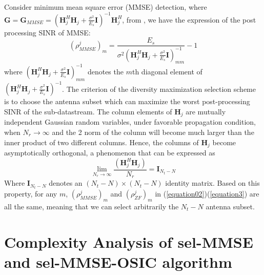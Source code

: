\documentclass[12pt,a4paper,final]{article}
\begin{document}
\begin{spacing}{2.5}
\begin{equation}
\end{equation}\\
Consider minimum mean square error (MMSE) detection, where $\mathbf{G}=\mathbf{G}_{MMSE}=(\mathbf{H}_{j}^{H}\mathbf{H}_{j}+\frac{\sigma^{2}}{E_{s}}\mathbf{I})^{-1}\mathbf{H}_{j}^{H}$, from \cite{5} \cite{6}, we have the expression of the post processing SINR of MMSE:
\begin{equation}
(\rho_{MMSE}^{j})_{m}=\frac{E_{s}}{\sigma^{2}(\mathbf{H}_{j}^{H}\mathbf{H}_{j}+\frac{\sigma^{2}}{E_{s}}\mathbf{I})^{-1}_{mm}}-1\label{equation3}
\end{equation}
where $(\mathbf{H}_{j}^{H}\mathbf{H}_{j}+\frac{\sigma^{2}}{E_{s}}\mathbf{I})^{-1}_{mm}$ denotes the $m$th diagonal element of $(\mathbf{H}_{j}^{H}\mathbf{H}_{j}+\frac{\sigma^{2}}{E_{s}}\mathbf{I})^{-1}$.
The criterion of the diversity maximization selection scheme is to choose the antenna subset which can maximize the worst post-processing SINR of the sub-datastream. The column elements of $\mathbf{H}_{j}$ are mutually independent Gaussian random variables, under favorable propagation condition, when $N_{r}\to \infty$ and the 2 norm of the column will become much larger than the inner product of two different columns. Hence, the columns of $\mathbf{H}_{j}$ become asymptotically orthogonal, a phenomenon that can be expressed as
\begin{equation}
\lim_{N_{r}\to \infty}\frac{(\mathbf{H}_{j}^{H}\mathbf{H}_{j})}{N_{r}}=\mathbf{I}_{N_t-N}
\end{equation}
 Where $\mathbf{I}_{N_t-N}$ denotes an $(N_{t}-N)\times (N_{t}-N)$ identity matrix. Based on this property, for any $m$, $(\rho_{MMSE}^{j})_{m}$ and $(\rho_{ZF}^{j})_{m}$ in (\ref{equation02})(\ref{equation3}) are all the same, meaning that we can select arbitrarily the $N_{t}-N$ antenna subset.
\section{Complexity Analysis of sel-MMSE and sel-MMSE-OSIC algorithm}\label{complexity}

\end{spacing}
\end{document}
